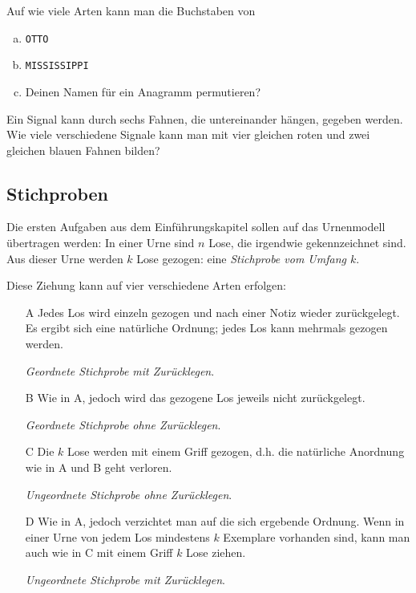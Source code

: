 \documentclass[%
11pt,%
twoside,%
titlepage,%
german,%
headsepline%
]{scrartcl}
\begin{document}
\begin{ueb}[Mississippi]
Auf wie viele Arten kann man die Buchstaben von
\begin{enumerate}[a)]
\item \texttt{OTTO}
\item \texttt{MISSISSIPPI}
\item Deinen Namen für ein Anagramm permutieren?
\end{enumerate}
\end{ueb}

\begin{ueb}[Schiffsfahnen]
Ein Signal kann durch sechs Fahnen, die untereinander hängen, gegeben werden. Wie viele verschiedene Signale kann man mit vier gleichen roten und zwei gleichen blauen Fahnen bilden?
\end{ueb}

\subsection{Stichproben}
Die ersten Aufgaben aus dem Einführungskapitel sollen auf das Urnenmodell übertragen werden: In einer Urne sind $n$ Lose, die irgendwie gekennzeichnet sind. Aus dieser Urne werden $k$ Lose gezogen: eine \emph{Stichprobe vom Umfang $k$}.

Diese Ziehung kann auf vier verschiedene Arten erfolgen:
\begin{itemize}
\item[A] Jedes Los wird einzeln gezogen und nach einer Notiz wieder zurückgelegt. Es ergibt sich eine natürliche Ordnung; jedes Los kann mehrmals gezogen werden.

\emph{Geordnete Stichprobe mit Zurücklegen}.
\item[B]  Wie in A, jedoch wird das gezogene Los jeweils nicht zurückgelegt.

\emph{Geordnete Stichprobe ohne Zurücklegen}.
\item[C] Die $k$ Lose werden mit einem Griff gezogen, d.h. die natürliche Anordnung wie in A und B geht verloren.

\emph{Ungeordnete Stichprobe ohne Zurücklegen}.
\item[D] Wie in A, jedoch verzichtet man auf die sich ergebende Ordnung. Wenn in einer Urne von jedem Los mindestens $k$ Exemplare vorhanden sind, kann man auch wie in C mit einem Griff $k$ Lose ziehen.

\emph{Ungeordnete Stichprobe mit Zurücklegen}.
\end{itemize}
\end{document}
